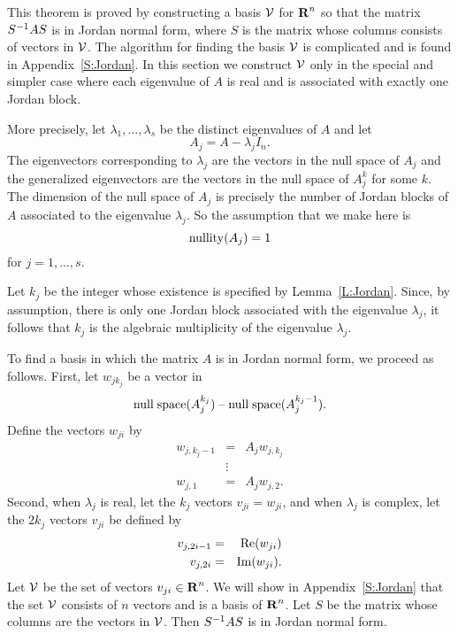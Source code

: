 This theorem is proved by constructing a basis ${\cal V}$ for $\mbox{$\bf{R}$}^n$ so 
that the matrix $S^{-1} AS$ is in Jordan normal form, where $S$ is the
matrix whose columns consists of vectors in ${\cal V}$.  The algorithm for 
finding the basis ${\cal V}$ is complicated and is found in 
Appendix~\ref{S:Jordan}.  In this section we construct ${\cal V}$ only in the 
special and simpler case where each eigenvalue of $A$ is real and is 
associated with exactly one Jordan block.

More precisely, let $\lambda_1,\ldots,\lambda_s$ be the distinct 
eigenvalues of $A$ and let 
\[
A_j = A-\lambda_jI_n.
\]   
The eigenvectors corresponding to $\lambda_j$ are the vectors in the
null space of $A_j$ and the 
generalized eigenvectors are the vectors in 
the null space of $A_j^k$ for some $k$.  The dimension of the null space 
of $A_j$ is precisely the number of Jordan blocks 
of $A$ associated to 
the eigenvalue $\lambda_j$.  So the assumption that we make here is 
\[
{\rm nullity}(A_j) = 1
\]
for $j = 1,\ldots,s$.

Let $k_j$ be the integer whose existence is specified by
Lemma~\ref{L:Jordan}.  Since, by assumption, there is only one Jordan block
associated with the eigenvalue $\lambda_j$, it follows that $k_j$ is the
algebraic multiplicity of the eigenvalue $\lambda_j$.

To find a basis in which the matrix $A$ is in Jordan normal 
form, we proceed as follows.  First, let 
$w_{jk_j}$ be a vector in 
\[
{\rm null\;space}(A_j^{k_j})\;\mbox{--}\;{\rm null\;space}(A_j^{k_j-1}).  
\]  
Define the vectors $w_{ji}$ by 
\begin{eqnarray*}
w_{j,k_j-1} & = & A_jw_{j,k_j} \\
& \vdots &  \\
w_{j,1} & = & A_jw_{j,2}.
\end{eqnarray*}
Second, when $\lambda_j$ is real, let the $k_j$ vectors $v_{ji}=w_{ji}$, and
when $\lambda_j$ is complex, let the $2k_j$ vectors $v_{ji}$ be defined by 
\begin{eqnarray*}
v_{j,2i-1} & = & {\rm Re}(w_{ji})\\
v_{j,2i} & = & {\rm Im}(w_{ji}). 
\end{eqnarray*}
Let ${\cal V}$ be the set of vectors $v_{ji}\in\mbox{$\bf{R}$}^n$.   We will show in
Appendix~\ref{S:Jordan} that the set ${\cal V}$ consists of $n$ vectors and 
is a basis of $\mbox{$\bf{R}$}^n$.  Let $S$ be the matrix whose columns are the
vectors in ${\cal V}$.  Then $S^{-1} AS$ is in Jordan normal form.

